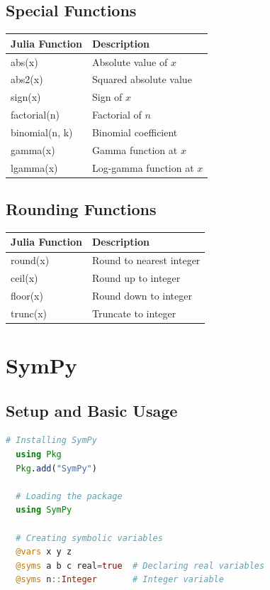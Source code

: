\documentclass[12pt,answers]{book}
\begin{document}
\section{Special Functions}
\begin{tabular}{>{\ttfamily}l l}
  \toprule
  \textbf{Julia Function} & \textbf{Description} \\
  \midrule
  abs(x) & Absolute value of $x$ \\
  abs2(x) & Squared absolute value \\
  sign(x) & Sign of $x$ \\
  factorial(n) & Factorial of $n$ \\
  binomial(n, k) & Binomial coefficient \\
  gamma(x) & Gamma function at $x$ \\
  lgamma(x) & Log-gamma function at $x$ \\
  \bottomrule
\end{tabular}

\section{Rounding Functions}
\begin{tabular}{>{\ttfamily}l l}
  \toprule
  \textbf{Julia Function} & \textbf{Description} \\
  \midrule
  round(x) & Round to nearest integer \\
  ceil(x) & Round up to integer \\
  floor(x) & Round down to integer \\
  trunc(x) & Truncate to integer \\
  \bottomrule
\end{tabular}

\chapter{SymPy}
  \section{Setup and Basic Usage}

\begin{lstlisting}[language=Julia]
  # Installing SymPy
  using Pkg
  Pkg.add("SymPy")

  # Loading the package
  using SymPy

  # Creating symbolic variables
  @vars x y z
  @syms a b c real=true  # Declaring real variables
  @syms n::Integer       # Integer variable
\end{lstlisting}
\end{document}

